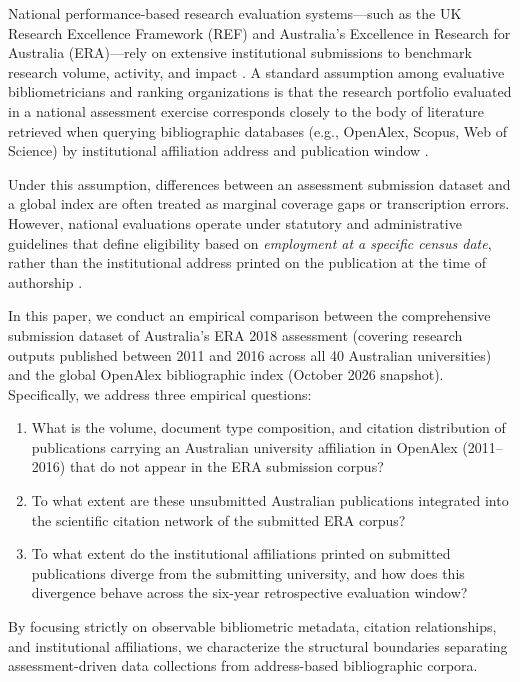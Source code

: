 \documentclass[11pt,a4paper]{article}
\begin{document}
National performance-based research evaluation systems---such as the UK Research Excellence Framework (REF) and Australia's Excellence in Research for Australia (ERA)---rely on extensive institutional submissions to benchmark research volume, activity, and impact \citep{hicks2012performance, de2013impact}. A standard assumption among evaluative bibliometricians and ranking organizations is that the research portfolio evaluated in a national assessment exercise corresponds closely to the body of literature retrieved when querying bibliographic databases (e.g., OpenAlex, Scopus, Web of Science) by institutional affiliation address and publication window \citep{van2002bibliometric, waltman2016review}.

Under this assumption, differences between an assessment submission dataset and a global index are often treated as marginal coverage gaps or transcription errors. However, national evaluations operate under statutory and administrative guidelines that define eligibility based on \textit{employment at a specific census date}, rather than the institutional address printed on the publication at the time of authorship \citep{arc2018submission}.

In this paper, we conduct an empirical comparison between the comprehensive submission dataset of Australia's ERA 2018 assessment (covering research outputs published between 2011 and 2016 across all 40 Australian universities) and the global OpenAlex bibliographic index (October 2026 snapshot). Specifically, we address three empirical questions:
\begin{enumerate}
    \item What is the volume, document type composition, and citation distribution of publications carrying an Australian university affiliation in OpenAlex (2011--2016) that do not appear in the ERA submission corpus?
    \item To what extent are these unsubmitted Australian publications integrated into the scientific citation network of the submitted ERA corpus?
    \item To what extent do the institutional affiliations printed on submitted publications diverge from the submitting university, and how does this divergence behave across the six-year retrospective evaluation window?
\end{enumerate}

By focusing strictly on observable bibliometric metadata, citation relationships, and institutional affiliations, we characterize the structural boundaries separating assessment-driven data collections from address-based bibliographic corpora.
\end{document}
